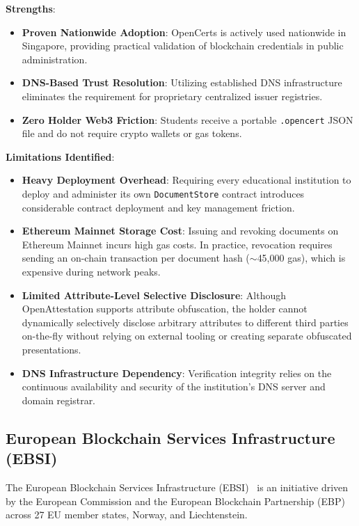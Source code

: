 \textbf{Strengths}:
\begin{itemize}
    \item \textbf{Proven Nationwide Adoption}: OpenCerts is actively used nationwide in Singapore, providing practical validation of blockchain credentials in public administration.
    \item \textbf{DNS-Based Trust Resolution}: Utilizing established DNS infrastructure eliminates the requirement for proprietary centralized issuer registries.
    \item \textbf{Zero Holder Web3 Friction}: Students receive a portable \texttt{.opencert} JSON file and do not require crypto wallets or gas tokens.
\end{itemize}

\textbf{Limitations Identified}:
\begin{itemize}
    \item \textbf{Heavy Deployment Overhead}: Requiring every educational institution to deploy and administer its own \texttt{DocumentStore} contract introduces considerable contract deployment and key management friction.
    \item \textbf{Ethereum Mainnet Storage Cost}: Issuing and revoking documents on Ethereum Mainnet incurs high gas costs. In practice, revocation requires sending an on-chain transaction per document hash ($\sim$45,000 gas), which is expensive during network peaks.
    \item \textbf{Limited Attribute-Level Selective Disclosure}: Although OpenAttestation supports attribute obfuscation, the holder cannot dynamically selectively disclose arbitrary attributes to different third parties on-the-fly without relying on external tooling or creating separate obfuscated presentations.
    \item \textbf{DNS Infrastructure Dependency}: Verification integrity relies on the continuous availability and security of the institution's DNS server and domain registrar.
\end{itemize}

\subsection{European Blockchain Services Infrastructure (EBSI)}

The European Blockchain Services Infrastructure (EBSI)~\cite{EBSI2023,EuropeanCommission2022ESSIF} is an initiative driven by the European Commission and the European Blockchain Partnership (EBP) across 27 EU member states, Norway, and Liechtenstein.

